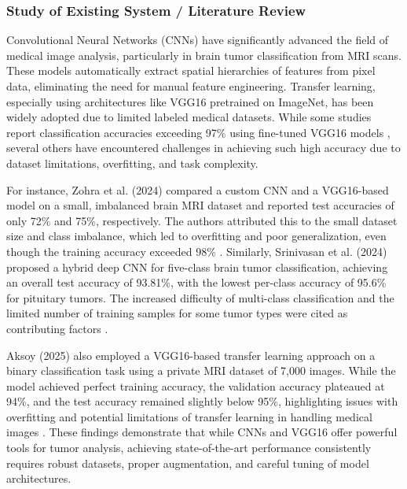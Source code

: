 
\subsubsection{Study of Existing System / Literature Review}
Convolutional Neural Networks (CNNs) have significantly advanced the field of medical image analysis, particularly in brain tumor classification from MRI scans. These models automatically extract spatial hierarchies of features from pixel data, eliminating the need for manual feature engineering. Transfer learning, especially using architectures like VGG16 pretrained on ImageNet, has been widely adopted due to limited labeled medical datasets. While some studies report classification accuracies exceeding 97\% using fine-tuned VGG16 models \cite{mathivanan2024} \cite{babu2023} \cite{khaliki2024}, several others have encountered challenges in achieving such high accuracy due to dataset limitations, overfitting, and task complexity.

For instance, Zohra et al. (2024) compared a custom CNN and a VGG16-based model on a small, imbalanced brain MRI dataset and reported test accuracies of only 72\% and 75\%, respectively. The authors attributed this to the small dataset size and class imbalance, which led to overfitting and poor generalization, even though the training accuracy exceeded 98\% \cite{zohra2024}. Similarly, Srinivasan et al. (2024) proposed a hybrid deep CNN for five-class brain tumor classification, achieving an overall test accuracy of 93.81\%, with the lowest per-class accuracy of 95.6\% for pituitary tumors. The increased difficulty of multi-class classification and the limited number of training samples for some tumor types were cited as contributing factors \cite{srinivasan2024}.

Aksoy (2025) also employed a VGG16-based transfer learning approach on a binary classification task using a private MRI dataset of 7,000 images. While the model achieved perfect training accuracy, the validation accuracy plateaued at 94\%, and the test accuracy remained slightly below 95\%, highlighting issues with overfitting and potential limitations of transfer learning in handling medical images \cite{aksoy2025}. These findings demonstrate that while CNNs and VGG16 offer powerful tools for tumor analysis, achieving state-of-the-art performance consistently requires robust datasets, proper augmentation, and careful tuning of model architectures.

